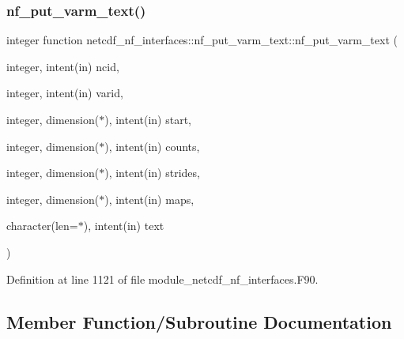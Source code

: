 \subsubsection{\texorpdfstring{nf\+\_\+put\+\_\+varm\+\_\+text()}{nf\_put\_varm\_text()}}
{\footnotesize\ttfamily integer function netcdf\+\_\+nf\+\_\+interfaces\+::nf\+\_\+put\+\_\+varm\+\_\+text\+::nf\+\_\+put\+\_\+varm\+\_\+text (\begin{DoxyParamCaption}\item[{integer, intent(in)}]{ncid,  }\item[{integer, intent(in)}]{varid,  }\item[{integer, dimension($\ast$), intent(in)}]{start,  }\item[{integer, dimension($\ast$), intent(in)}]{counts,  }\item[{integer, dimension($\ast$), intent(in)}]{strides,  }\item[{integer, dimension($\ast$), intent(in)}]{maps,  }\item[{character(len=$\ast$), intent(in)}]{text }\end{DoxyParamCaption})}



Definition at line 1121 of file module\+\_\+netcdf\+\_\+nf\+\_\+interfaces.\+F90.



\subsection{Member Function/\+Subroutine Documentation}
\mbox{\label{interfacenetcdf__nf__interfaces_1_1nf__put__varm__text_af9cd1922296498b5a8f82eb52f25995a}} 
